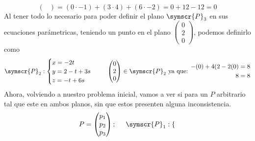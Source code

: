 \documentclass{article}
\def\fancyP{\symscr{P}}
\begin{document}
\begin{enumerate}
\begin{itemize}
\begin{itemize}
\[\begin{pmatrix}
                        \end{pmatrix}
                        =
                        (0 \cdot -1) + (3 \cdot 4) + (6 \cdot -2)
                        =
                        0 + 12 - 12
                        =
                        0
                    \]
                    Al tener todo lo necesario para poder definir el plano \(\fancyP_3\) en sus ecuaciones parámetricas, teniendo un punto en el plano \(\left(\begin{smallmatrix}0 \\ 2 \\ 0\end{smallmatrix}\right)\), 
                    podemos definirlo como
                    \[
                        \fancyP_2: \begin{cases}
                            x = -2t \\
                            y = 2 -t + 3s \\
                            z = -t + 6s
                        \end{cases}
                        \hspace{0.5cm}
                        \begin{pmatrix}
                            0 \\ 2 \\ 0
                        \end{pmatrix}
                        \in
                        \fancyP_2
                        \text{ ya que: }
                        \begin{aligned}
                            -(0) + 4(2 -2(0) &= 8 \\
                            8 &= 8 \\
                        \end{aligned}
                    \]
                    Ahora, volviendo a nuestro problema inicial, vamos a ver si para un \(P\) arbitrario tal que este en ambos planos, sin que estos presenten alguna inconsistencia.
                    \[
                        P = 
                        \begin{pmatrix}
                            p_1 \\ p_2 \\ p_3
                        \end{pmatrix};
                        \hspace{0.5cm}
                        \fancyP_1:
                        \begin{cases}

\end{cases}\]
\end{itemize}
\end{itemize}
\end{enumerate}
\end{document}
